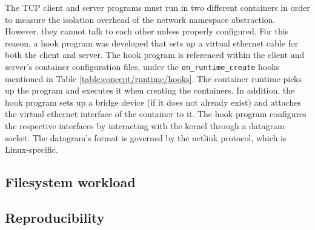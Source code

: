 The TCP client and server programs must run in two different containers in order to measure 
the isolation overhead of the network namespace abstraction. However, they cannot talk to each other 
unless properly configured. For this reason, a hook program was developed that sets up a virtual 
ethernet cable for both the client and server. The hook program is referenced within the 
client and server's container configuration files, under the \verb|on_runtime_create| hooks mentioned in Table \ref{table:concept/runtime/hooks}. 
The container runtime picks up the program and executes it when creating the containers.
In addition, the hook program sets up a bridge device (if it does not already exist) and attaches 
the virtual ethernet interface of the container to it. 
The hook program configures the respective interfaces by interacting with the kernel through a 
datagram socket. The datagram's format is governed by the netlink protocol, which is Linux-specific.

\subsection{Filesystem workload}
\subsection{Reproducibility}
